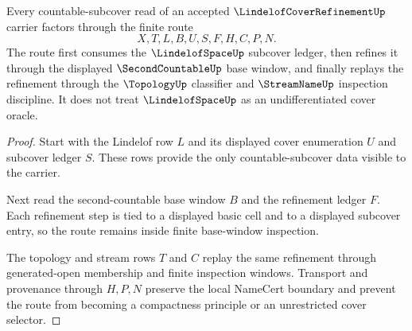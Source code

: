 \begin{theorem}
\label{thm:lindelof-cover-refinement-countable-subcover-route}
Every countable-subcover read of an accepted $\LindelofCoverRefinementUp$ carrier factors through the finite route
$$
X,T,L,B,U,S,F,H,C,P,N.
$$
The route first consumes the $\LindelofSpaceUp$ subcover ledger, then refines it through the displayed $\SecondCountableUp$ base window, and finally replays the refinement through the $\TopologyUp$ classifier and $\StreamNameUp$ inspection discipline. It does not treat $\LindelofSpaceUp$ as an undifferentiated cover oracle.
\end{theorem}
\begin{proof}
Start with the Lindelof row $L$ and its displayed cover enumeration $U$ and subcover ledger $S$. These rows provide the only countable-subcover data visible to the carrier.

Next read the second-countable base window $B$ and the refinement ledger $F$. Each refinement step is tied to a displayed basic cell and to a displayed subcover entry, so the route remains inside finite base-window inspection.

The topology and stream rows $T$ and $C$ replay the same refinement through generated-open membership and finite inspection windows. Transport and provenance through $H,P,N$ preserve the local NameCert boundary and prevent the route from becoming a compactness principle or an unrestricted cover selector.
\end{proof}


\begin{closurestatus}{\LindelofCoverRefinementUp}
  \theoryclosure{\seedClosure}
  \formalstatus{\unformalizedV}
\end{closurestatus}
